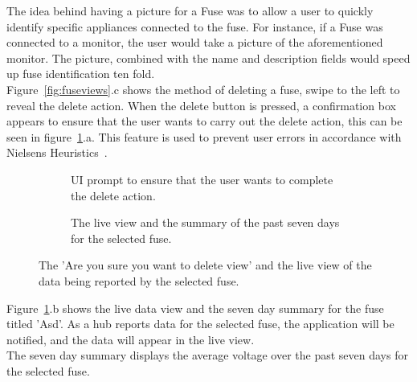 \documentclass[draft,preprint,12pt,3p]{elsarticle}
\begin{document}
The idea behind having a picture for a Fuse was to allow a user to quickly identify specific appliances connected to the fuse. For instance, if a Fuse was connected to a monitor, the user would take a picture of the aforementioned monitor. The picture, combined with the name and description fields would speed up fuse identification ten fold.\\
Figure~\ref{fig:fuseviews}.c shows the method of deleting a fuse, swipe to the left to reveal the delete action. When the delete button is pressed, a confirmation box appears to ensure that the user wants to carry out the delete action, this can be seen in figure~\ref{fig:deletelive}.a. This feature is used to prevent user errors in accordance with Nielsens Heuristics~\cite{nielsen}.

\begin{figure}[H]
    \centering
    \begin{subfigure}[t]{0.32\columnwidth}
        \centering
        \caption{UI prompt to ensure that the user wants to complete the delete action.}
    \end{subfigure}
    \begin{subfigure}[t]{0.32\columnwidth}
        \centering
        \caption{The live view and the summary of the past seven days for the selected fuse.}
    \end{subfigure}
    \caption{The 'Are you sure you want to delete view' and the live view of the data being reported by the selected fuse.}
    \label{fig:deletelive}
\end{figure}
Figure~\ref{fig:deletelive}.b shows the live data view and the seven day summary for the fuse titled 'Asd'. As a hub reports data for the selected fuse, the application will be notified, and the data will appear in the live view.\\
The seven day summary displays the average voltage over the past seven days for the selected fuse.
\end{document}

